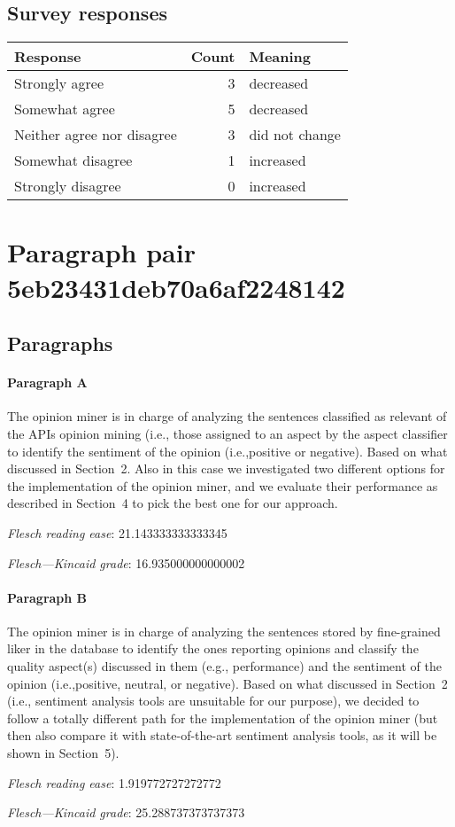 \subsection{Survey responses}
\begin{tabular}{lrl}
\toprule
          \textbf{Response} &  \textbf{Count} & \textbf{Meaning} \\
\midrule
             Strongly agree &               3 &        decreased \\
             Somewhat agree &               5 &        decreased \\
 Neither agree nor disagree &               3 &   did not change \\
          Somewhat disagree &               1 &        increased \\
          Strongly disagree &               0 &        increased \\
\bottomrule
\end{tabular}

\section{Paragraph pair 5eb23431deb70a6af2248142}
\subsection{Paragraphs}
\paragraph{Paragraph A}
The opinion miner is in charge of analyzing the sentences classified as relevant of the APIs opinion mining (i.e., those assigned to an aspect by the aspect classifier to identify the sentiment of the opinion (i.e.,positive or negative). Based on what discussed in Section 2. Also in this case we investigated two different options for the implementation of the opinion miner, and we evaluate their performance as described in Section 4 to pick the best one for our approach.\par\medskip\emph{Flesch reading ease}: 21.143333333333345\par\emph{Flesch---Kincaid grade}: 16.935000000000002

\paragraph{Paragraph B}
The opinion miner is in charge of analyzing the sentences stored by fine-grained liker in the database to identify the ones reporting opinions and classify the quality aspect(s) discussed in them (e.g., performance) and the sentiment of the opinion (i.e.,positive, neutral, or negative). Based on what discussed in Section 2 (i.e., sentiment analysis tools are unsuitable for our purpose), we decided to follow a totally different path for the implementation of the opinion miner (but then also compare it with state-of-the-art sentiment analysis tools, as it will be shown in Section 5).\par\medskip\emph{Flesch reading ease}: 1.919772727272772\par\emph{Flesch---Kincaid grade}: 25.288737373737373

